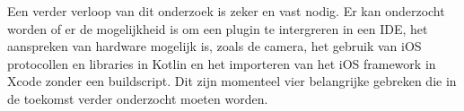 Een verder verloop van dit onderzoek is zeker en vast nodig. Er kan onderzocht worden of er de mogelijkheid is om een plugin te intergreren in een IDE, het aanspreken van hardware mogelijk is, zoals de camera, het gebruik van iOS protocollen en libraries in Kotlin en het importeren van het iOS framework in Xcode zonder een buildscript. Dit zijn momenteel vier belangrijke gebreken die in de toekomst verder onderzocht moeten worden.